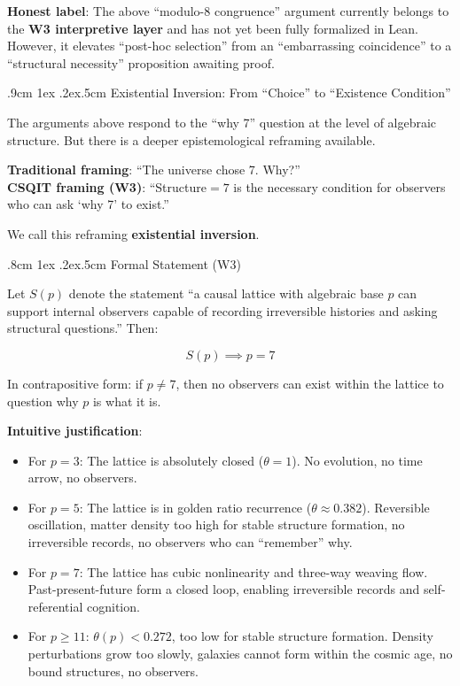 \documentclass[aps,prd,twocolumn,nofootinbib,floatfix]{revtex4-2}
\makeatletter
\def\subsection{%
  \@startsection{subsection}{2}{\z@}
    {.9cm \@plus1ex \@minus .2ex}{.5cm}
    {\normalfont\normalsize\bfseries\centering}%
}
\def\subsubsection{%
  \@startsection{subsubsection}{3}{\z@}
    {.8cm \@plus1ex \@minus .2ex}{.5cm}
    {\normalfont\normalsize\itshape\centering}%
}
\makeatother
\begin{document}
\medskip

\noindent\textbf{Honest label}: The above ``modulo-8 congruence'' argument currently belongs to the \textbf{W3 interpretive layer} and has not yet been fully formalized in Lean. However, it elevates ``post-hoc selection'' from an ``embarrassing coincidence'' to a ``structural necessity'' proposition awaiting proof.

\subsection{Existential Inversion: From ``Choice'' to ``Existence Condition''}

The arguments above respond to the ``why 7'' question at the level of algebraic structure. But there is a deeper epistemological reframing available.

\textbf{Traditional framing}: ``The universe chose 7. Why?'' \\
\textbf{CSQIT framing (W3)}: ``Structure$=7$ is the necessary condition for observers who can ask `why 7' to exist.''

We call this reframing \textbf{existential inversion}.

\subsubsection{Formal Statement (W3)}

Let $S(p)$ denote the statement ``a causal lattice with algebraic base $p$ can support internal observers capable of recording irreversible histories and asking structural questions.'' Then:

\[
S(p) \implies p = 7
\]

In contrapositive form: if $p \neq 7$, then no observers can exist within the lattice to question why $p$ is what it is.

\textbf{Intuitive justification}:
\begin{itemize}
    \item For $p=3$: The lattice is absolutely closed ($\theta=1$). No evolution, no time arrow, no observers.
    \item For $p=5$: The lattice is in golden ratio recurrence ($\theta \approx 0.382$). Reversible oscillation, matter density too high for stable structure formation, no irreversible records, no observers who can ``remember'' why.
    \item For $p=7$: The lattice has cubic nonlinearity and three-way weaving flow. Past-present-future form a closed loop, enabling irreversible records and self-referential cognition.
    \item For $p \ge 11$: $\theta(p) < 0.272$, too low for stable structure formation. Density perturbations grow too slowly, galaxies cannot form within the cosmic age, no bound structures, no observers.
\end{itemize}
\end{document}
